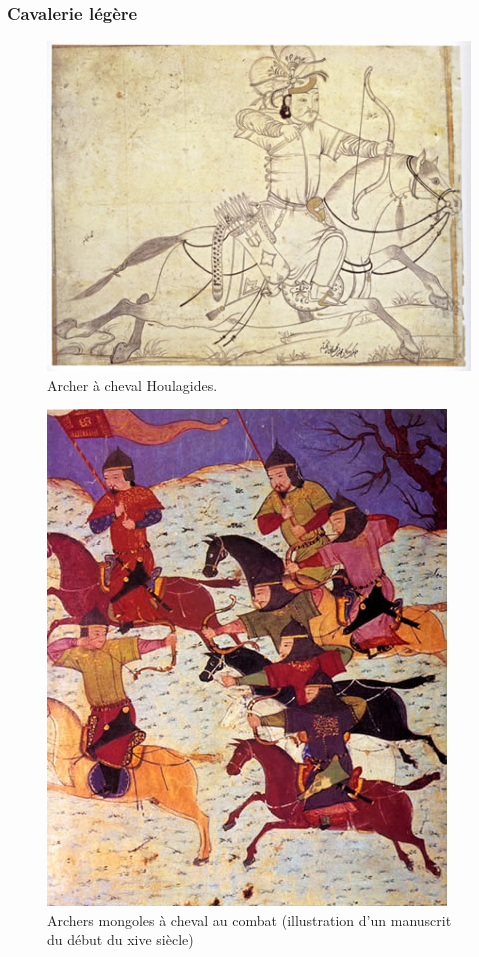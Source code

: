 \documentclass{article}
\begin{document}
\subsubsection{Cavalerie légère}
\begin{figure}[H]
	\begin{centering}
	\includegraphics[width=0.5\paperwidth]{../ressources/IlkhanidHorseArcher}
	\caption{Archer à cheval Houlagides. \cite{archery}}
	\end{centering}
\end{figure}
\begin{figure}[H]
	\begin{centering}
	\includegraphics[width=0.47\paperwidth]{../ressources/MongolCavalrymen}
	\caption{Archers mongoles à cheval au combat (illustration d'un manuscrit du début du xive siècle) \cite{mongol_army}}
	\end{centering}
\end{figure}
\end{document}
